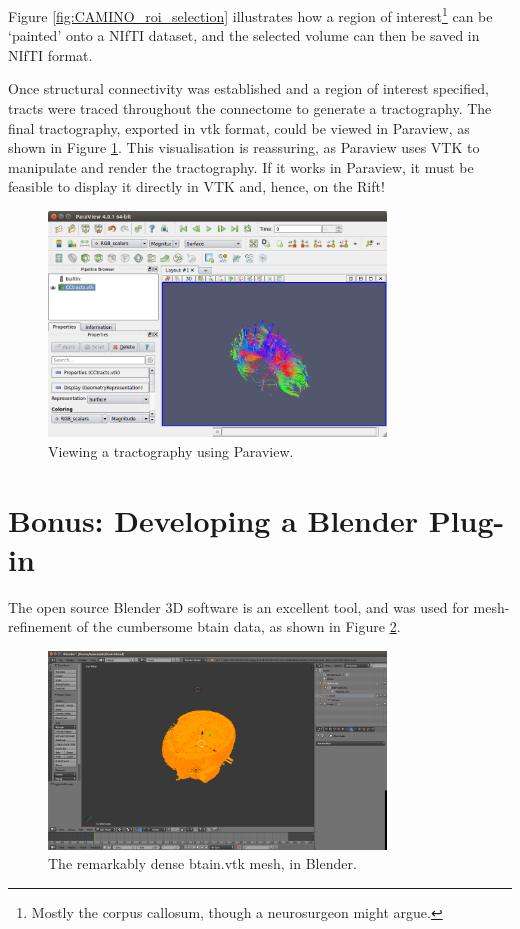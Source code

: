 \documentclass[MSc,paper=a4,pagesize=auto]{icldt}
\begin{document}
Figure \ref{fig:CAMINO_roi_selection} illustrates how a region of interest\footnote{Mostly the corpus callosum, though a neurosurgeon might argue.} can be `painted' onto a NIfTI dataset, and the selected volume can then be saved in NIfTI format.

Once structural connectivity was established and a region of interest specified, tracts were traced throughout the connectome to generate a tractography. The final tractography, exported in vtk format, could be viewed in Paraview, as shown in Figure \ref{fig:CAMINO_paraview}. This visualisation is reassuring, as Paraview uses VTK to manipulate and render the tractography. If it works in Paraview, it must be feasible to display it directly in VTK and, hence, on the Rift!

\begin{figure}[htbp!]
    \centering
    \includegraphics[width=0.8\textwidth]{resources/CAMINO_paraview}
    \caption{Viewing a tractography using Paraview.}
    \label{fig:CAMINO_paraview}
\end{figure}

\section{Bonus: Developing a Blender Plug-in}
The open source Blender 3D software is an excellent tool, and was used for mesh-refinement of the cumbersome btain data, as shown in Figure \ref{fig:blender_brain}. 

\begin{figure}[htbp!]
    \centering
    \includegraphics[width=0.8\textwidth]{resources/blender_brain}
    \caption{The remarkably dense btain.vtk mesh, in Blender.}
    \label{fig:blender_brain}
\end{figure}
\end{document}
